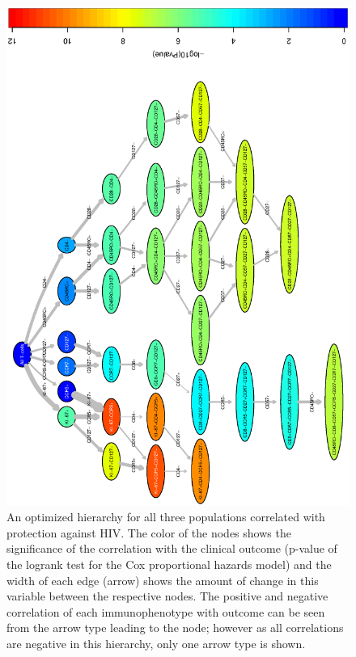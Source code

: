 \begin{landscape}
  \begin{figure}[ht]
    \begin{center}
      \includegraphics[width=\textwidth,angle=270]{figs/rchy/merged}
    \end{center}
    \caption{An optimized hierarchy for all three populations correlated with protection against HIV.
      The color of the nodes shows the significance of the correlation with the clinical outcome (p-value of the logrank test for the Cox proportional hazards model) and the width of each edge (arrow) shows the amount of change in this variable between the respective nodes.
      The positive and negative correlation of each immunophenotype with outcome can be seen from the arrow type leading to the node; however as all correlations are negative in this hierarchy, only one arrow type is shown. 
   }
    \label{r1:merged}
  \end{figure}
\end{landscape}



